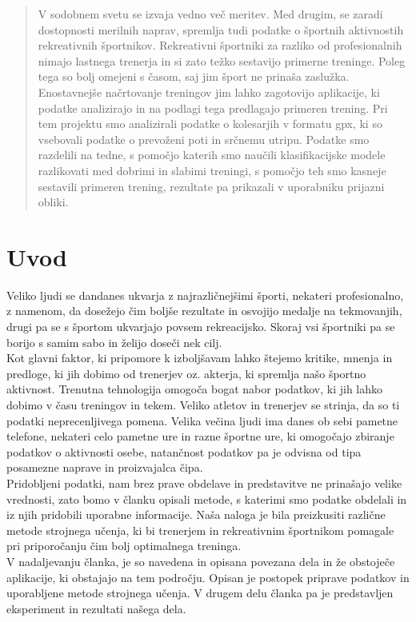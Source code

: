 \documentclass{acm_proc_article-sp}
\begin{document}
\maketitle
\begin{abstract}
V sodobnem svetu se izvaja vedno več meritev. Med drugim, se zaradi dostopnosti merilnih naprav, spremlja tudi podatke o športnih aktivnostih rekreativnih športnikov. Rekreativni športniki za razliko od profesionalnih nimajo lastnega trenerja in si zato težko sestavijo primerne treninge. Poleg tega so bolj omejeni s časom, saj jim šport ne prinaša zaslužka. Enostavnejše načrtovanje treningov jim lahko zagotovijo aplikacije, ki podatke analizirajo in na podlagi tega predlagajo primeren trening. Pri tem projektu smo analizirali podatke o kolesarjih v formatu gpx, ki so vsebovali podatke o prevoženi poti in srčnemu utripu. Podatke smo razdelili na tedne, s pomočjo katerih smo naučili klasifikacijske modele razlikovati med dobrimi in slabimi treningi, s pomočjo teh smo kasneje sestavili primeren trening, rezultate pa prikazali v uporabniku prijazni obliki.
\end{abstract}




\section{Uvod}
Veliko ljudi se dandanes ukvarja z najrazličnejšimi športi, nekateri profesionalno, z namenom, da dosežejo čim boljše rezultate in osvojijo medalje na tekmovanjih, drugi pa se s športom ukvarjajo povsem rekreacijsko. Skoraj vsi športniki pa se borijo s samim sabo in želijo doseči nek cilj.\\
Kot glavni faktor, ki pripomore k izboljšavam lahko štejemo kritike, mnenja in predloge, ki jih dobimo od trenerjev oz. akterja, ki spremlja našo športno aktivnost. Trenutna tehnologija omogoča bogat nabor podatkov, ki jih lahko dobimo v času treningov in tekem. Veliko atletov in trenerjev se strinja, da so ti podatki neprecenljivega pomena\cite{Liebermann}. Velika večina ljudi ima danes ob sebi pametne telefone, nekateri celo pametne ure in razne športne ure, ki omogočajo zbiranje podatkov o aktivnosti osebe, natančnost podatkov pa je odvisna od tipa posamezne naprave in proizvajalca čipa\cite{Case}.\\
Pridobljeni podatki, nam brez prave obdelave in predstavitve ne prinašajo velike vrednosti, zato bomo v  članku opisali metode, s katerimi smo podatke obdelali in iz njih pridobili uporabne informacije. Naša naloga je bila preizkusiti različne metode strojnega učenja, ki bi trenerjem in rekreativnim športnikom pomagale pri priporočanju čim bolj optimalnega treninga.\\
V nadaljevanju članka, je so navedena in opisana povezana dela in že obstoječe aplikacije, ki obstajajo na tem področju. Opisan je postopek priprave podatkov in uporabljene metode strojnega učenja. V drugem delu članka pa je predstavljen eksperiment in rezultati našega dela.
\end{document}
